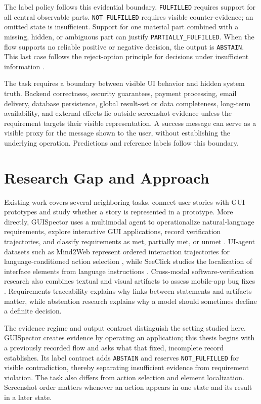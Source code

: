 The label policy follows this evidential boundary. \texttt{FULFILLED} requires support
for all central observable parts. \texttt{NOT\_FULFILLED} requires visible
counter-evidence; an omitted state is insufficient. Support for one material
part combined with a missing, hidden, or ambiguous part can justify
\texttt{PARTIALLY\_\allowbreak FULFILLED}. When the flow supports no reliable positive or negative
decision, the output is \texttt{ABSTAIN}. This last case follows the reject-option
principle for decisions under insufficient information \autocite{hendrickx2024,wen2025}.

The task requires a boundary between visible UI behavior and hidden system
truth. Backend correctness, security guarantees, payment processing, email
delivery, database persistence, global result-set or data completeness,
long-term availability,
and external effects lie outside screenshot evidence unless the requirement
targets their visible representation. A success message can serve as a visible
proxy for the message shown to the user, without establishing the underlying
operation. Predictions and reference labels follow this boundary.

\section{Research Gap and Approach}\label{research-gap-and-approach}

Existing work covers several neighboring tasks. \textcite{kretzer2025} connect user stories with GUI prototypes and study whether a story is represented in a prototype. More directly, GUISpector uses a multimodal agent to operationalize natural-language requirements, explore interactive GUI applications, record verification trajectories, and classify requirements as met, partially met, or unmet \autocite{kolthoff2025guispector}. UI-agent datasets such as Mind2Web represent ordered interaction trajectories for language-conditioned action selection \autocite{deng2023}, while SeeClick studies the localization of interface elements from language instructions \autocite{cheng2024}. Cross-modal software-verification research also combines textual and visual artifacts to assess mobile-app bug fixes \autocite{massenon2026}. Requirements traceability explains why links between statements and artifacts matter, while abstention research explains why a model should sometimes decline a definite decision.

The evidence regime and output contract distinguish the setting studied here.
GUISpector creates evidence by operating an application; this thesis begins with
a previously recorded flow and asks what that fixed, incomplete record
establishes. Its label contract adds \texttt{ABSTAIN} and reserves \texttt{NOT\_FULFILLED} for
visible contradiction, thereby separating insufficient evidence from
requirement violation. The task also differs from action selection and element
localization. Screenshot order matters whenever an action appears in one state
and its result in a later state.


